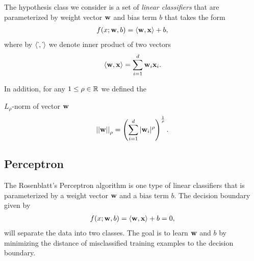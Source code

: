 The hypothesis class we consider is a set of \textit{linear classifiers} that are parameterized by weight vector $\mathbf {w}$ and bias term $b$ that takes the form
\begin{align}
	f(x;\mathbf {w},b) = \langle \mathbf {w}, \mathbf {x} \rangle + b, \label{linearclassifier}
\end{align}
where by $\langle \dot\,, \dot\, \rangle$ we denote inner product of two vectors
\begin{align*}
	\langle \mathbf {w}, \mathbf {x} \rangle = \sum_{i=1}^{d}\mathbf {w}_i\mathbf {x}_i.
\end{align*}

In addition, for any $1\le\rho\in\mathbb{R}$ we defined the {$L_{\rho}$-norm of vector $\mathbf {w}$ 
\begin{align*}
	\left|\left| \mathbf {w} \right|\right|_{\rho} = \left(\sum_{i=1}^{d}|\mathbf {w}_i|^{\rho}\right)^{\frac{1}{\rho}}.
\end{align*}


%
%
\subsection{Perceptron}

The Rosenblatt's Perceptron algorithm \citep{Rosenblatt58,Rosenblatt62} is one type of linear classifiers that is parameterized by a weight vector $\mathbf {w}$ and a bias term $b$. 
The decision boundary given by 
\begin{align*}
	f(x;\mathbf {w},b) = \langle \mathbf {w}, \mathbf {x} \rangle + b =0,
\end{align*}
will separate the data into two classes.
The goal is to learn $\mathbf {w}$ and $b$ by minimizing the distance of misclassified training examples to the decision boundary.

}
